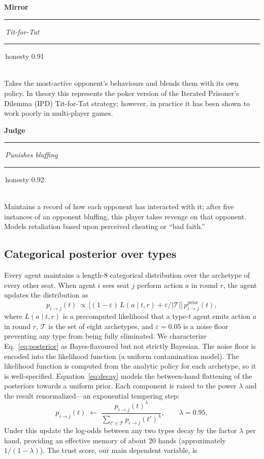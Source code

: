 \documentclass[journal]{IEEEtran}
\newcommand{\arch}[1]{\textbf{#1}}
\newcommand{\bbar}{\,\rule[-0.5pt]{0.5pt}{8pt}\,}
\newcommand{\archentry}[4]{%
  \par\vspace{5pt}\noindent
  {\sffamily\fontsize{10}{12}\selectfont\arch{#1}\bbar\textit{#2}\bbar honesty #3}\\[1pt]
  \small #4\par}
\begin{document}
\archentry{Mirror}{Tit-for-Tat}{0.91}{%
  Takes the most-active opponent's behaviours and blends them with
  its own policy. In theory this represents the poker version of the
  Iterated Prisoner's Dilemma (IPD) Tit-for-Tat strategy; however, in
  practice it has been shown to work poorly in multi-player
  games.}

\archentry{Judge}{Punishes bluffing}{0.92}{%
  Maintains a record of how each opponent has interacted with it;
  after five instances of an opponent bluffing, this player takes
  revenge on that opponent. Models retaliation based upon perceived
  cheating or ``bad faith.''}

\subsection{Categorical posterior over types}\label{sec:posterior}
Every agent maintains a length-8 categorical distribution over the
archetype of every other seat. When agent $i$ sees seat $j$ perform
action $a$ in round $r$, the agent updates the distribution as
\begin{equation}
  p_{i\to j}(t)\,\propto\,
    \bigl[(1-\varepsilon)\,L(a\mid t,r)
          + \varepsilon/|\mathcal{T}|\bigr]\,
    p_{i\to j}^{\text{prior}}(t),
  \label{eq:posterior}
\end{equation}
where $L(a\mid t, r)$ is a precomputed likelihood that a type-$t$
agent emits action $a$ in round $r$, $\mathcal{T}$ is the set of
eight archetypes, and $\varepsilon = 0.05$ is a noise floor
preventing any type from being fully eliminated. We characterize
Eq.~\ref{eq:posterior} as Bayes-flavoured but not strictly
Bayesian. The noise floor is encoded into the likelihood function
(a uniform contamination model). The likelihood function is computed
from the analytic policy for each archetype, so it is well-specified.
Equation~\ref{eq:decay} models the between-hand flattening of the
posteriors towards a uniform prior. Each component is raised to the
power $\lambda$ and the result renormalized---an exponential
tempering step:
\begin{equation}
  p_{i\to j}(t) \;\leftarrow\;
    \frac{p_{i\to j}(t)^{\lambda}}
         {\sum_{t'\in\mathcal{T}} p_{i\to j}(t')^{\lambda}},
  \qquad \lambda = 0.95,
  \label{eq:decay}
\end{equation}
Under this update the log-odds between any two types decay by the
factor $\lambda$ per hand, providing an effective memory of about 20
hands (approximately $1/(1-\lambda)$). The trust score, our main dependent variable, is
\end{document}
